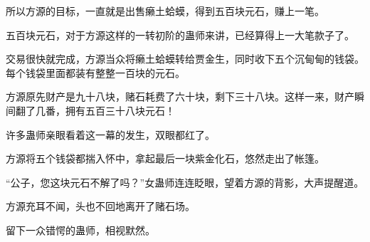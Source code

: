 \begin{this_body}
所以方源的目标，一直就是出售癞土蛤蟆，得到五百块元石，赚上一笔。

五百块元石，对于方源这样的一转初阶的蛊师来讲，已经算得上一大笔款子了。

交易很快就完成，方源当众将癞土蛤蟆转给贾金生，同时收下五个沉甸甸的钱袋。每个钱袋里面都装有整整一百块的元石。

方源原先财产是九十八块，赌石耗费了六十块，剩下三十八块。这样一来，财产瞬间翻了几番，拥有五百三十八块元石！

许多蛊师亲眼看着这一幕的发生，双眼都红了。

方源将五个钱袋都揣入怀中，拿起最后一块紫金化石，悠然走出了帐篷。

“公子，您这块元石不解了吗？”女蛊师连连眨眼，望着方源的背影，大声提醒道。

方源充耳不闻，头也不回地离开了赌石场。

留下一众错愕的蛊师，相视默然。

\end{this_body}


